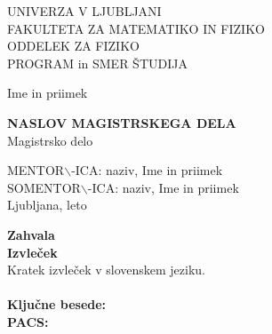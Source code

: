 \def\epsfg#1#2{\epsfig{file=#1.eps,width=#2}}
\def\legendamp#1#2{\vbox{\hsize=#1\caption{\small #2}}}

\setcounter{topnumber}{4}
\setcounter{bottomnumber}{4}
\setcounter{totalnumber}{5}
\renewcommand{\topfraction}{0.99}
\renewcommand{\bottomfraction}{0.99}
\renewcommand{\textfraction}{0.0}
\setlength{\tabcolsep}{10pt}
\renewcommand{\arraystretch}{1.5}

\def\bi#1{\hbox{\boldmath{$#1$}}}
\let\oldvec\vec
\def\vec#1{\mbox{\boldmath$#1$}}
\def\pol{{\textstyle{1\over2}}}
\def\svec#1{\mbox{{\scriptsize \boldmath$#1$}}}




\pagestyle{empty}
\begin{center}

{\large UNIVERZA V LJUBLJANI\\
FAKULTETA ZA MATEMATIKO IN FIZIKO\\
ODDELEK ZA FIZIKO\\
PROGRAM in SMER ŠTUDIJA\\}


\vspace{4cm}


{\Large Ime in priimek\\}

\vspace{10mm}

{\bf \Large NASLOV MAGISTRSKEGA DELA}\\
\vspace{5mm}
{\large Magistrsko delo}\\




\vfill



{\large MENTOR$\backslash$-ICA: naziv, Ime in priimek\\
SOMENTOR$\backslash$-ICA: naziv, Ime in priimek\\


\vspace{2cm}
Ljubljana, leto}

\end{center}


\cleardoublepage
\mbox{}
\vfill
{\Large \bf Zahvala}
\vspace{1cm}\\


\cleardoublepage
{\Large \bf Izvleček}
\vspace{1cm}\\
Kratek izvleček v slovenskem jeziku.\\
\vspace{1cm}\\
{\bf Ključne besede:}\\
{\bf PACS:}

